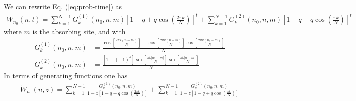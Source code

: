 \documentclass[superscriptaddress, amsmath, amssymb, aps, pre, floatfix]{revtex4-2}
\begin{document}
We can rewrite Eq. (\ref{eq:prob-time}) as
\begin{align}
W_{n_0}(n,t)= \sum_{k=1}^{N-1}G^{(1)}_k(n_0,n,m)\left[1-q+q\cos\left(\frac{2 \pi k}{N}\right)\right]^t +\sum_{k=1}^{N-1}G^{(2)}_k(n_0,n,m)\left[1-q+q\cos\left(\frac{\pi k}{N}\right)\right]^t 
\label{eq:compactprob_abs}
\end{align}
where $m$ is the absorbing site, and with
\begin{align}
G^{(1)}_k(n_0,n,m)&= \frac{\cos\left[\frac{2\pi k (n-n_0)}{N}\right]-\cos\left[\frac{2\pi k (n-m)}{N}\right]\cos\left[\frac{2\pi k (n_0-m)}{N}\right]}{N} \nonumber \\
G^{(2)}_k(n_0,n,m)&=\frac{\left[1-(-1)^k\right]\sin\left[\frac{\pi k |n_0-m|}{N}\right]\!\sin\left[\frac{\pi k |n-m|}{N}\right]}{N}
\label{eq:Gk}
\end{align}
In terms of generating functions one has
\begin{align}
\widetilde{W}_{n_0}(n,z)= \sum_{k=1}^{N-1}\frac{G^{(1)}_k(n_0,n,m)}{1-z\left[1-q+q\cos\left(\frac{2 \pi k}{N}\right)\right]} + \sum_{k=1}^{N-1}\frac{G^{(2)}_k(n_0,n,m)}{1-z\left[1-q+q\cos\left(\frac{\pi k}{N}\right)\right]} 
\label{eq:compactprob_abs_z}
\end{align}
\end{document}

